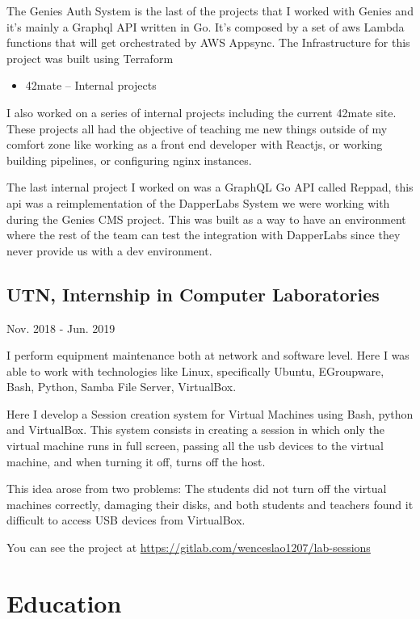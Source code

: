 \documentclass[11pt]{article}
\begin{document}
The Genies Auth System is the last of the projects that I worked with Genies and it’s mainly a Graphql API written in Go. It's composed by a set of aws Lambda functions that will get orchestrated by AWS Appsync. 
The Infrastructure for this project was built using Terraform

\begin{itemize}
\item 42mate – Internal projects
\end{itemize}

I also worked on a series of internal projects including the current 42mate site.
These projects all had the objective of teaching me new things outside of my comfort zone like working as a front end developer with Reactjs, or working building pipelines, or configuring nginx instances. 

The last internal project I worked on was a GraphQL Go API called Reppad, this api was a reimplementation of the DapperLabs System we were working with during the Genies CMS project.
This was built as a way to have an environment where the rest of the team can test the integration with DapperLabs since they never provide us with a dev environment.

\subsection{UTN, Internship in Computer Laboratories}
\label{sec:org20b04d9}
Nov. 2018 - Jun. 2019

I perform equipment maintenance both at network and software level. Here I was able to work with technologies like Linux, specifically Ubuntu, EGroupware, Bash, Python, Samba File Server, VirtualBox.

Here I develop a Session creation system for Virtual Machines using Bash, python and VirtualBox. This system consists in creating a session in which only the virtual machine runs in full screen, passing all the usb devices to the virtual machine, and when turning it off, turns off the host. 

This idea arose from two problems: The students did not turn off the virtual machines correctly, damaging their disks, and both students and teachers found it difficult to access USB devices from VirtualBox. 

You can see the project at \url{https://gitlab.com/wenceslao1207/lab-sessions}

\section{Education}
\label{sec:org68fb960}
\end{document}

